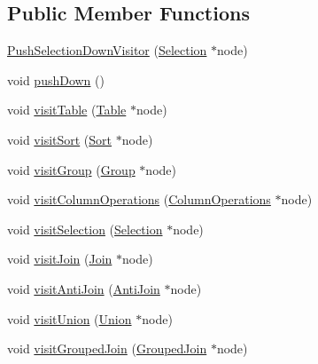 \subsection*{Public Member Functions}
\begin{DoxyCompactItemize}
\item 
\hyperlink{classrafe_1_1_push_selection_down_visitor_a2854b5c8406e3839eb3fe55f3a519418}{Push\+Selection\+Down\+Visitor} (\hyperlink{classrafe_1_1_selection}{Selection} $\ast$node)
\item 
void \hyperlink{classrafe_1_1_push_selection_down_visitor_a5d8909a5f4757aec278c185f41b3e11c}{push\+Down} ()
\item 
void \hyperlink{classrafe_1_1_push_selection_down_visitor_a22d4efbe167182bb5815c3155e4dfb15}{visit\+Table} (\hyperlink{classrafe_1_1_table}{Table} $\ast$node)
\item 
void \hyperlink{classrafe_1_1_push_selection_down_visitor_a4ea8d60b4150cbd0e7f95bd24f551433}{visit\+Sort} (\hyperlink{classrafe_1_1_sort}{Sort} $\ast$node)
\item 
void \hyperlink{classrafe_1_1_push_selection_down_visitor_adc69a8ddf6a81cdfb1ab4ea8b2cdaf6e}{visit\+Group} (\hyperlink{classrafe_1_1_group}{Group} $\ast$node)
\item 
void \hyperlink{classrafe_1_1_push_selection_down_visitor_a4e6aa36753bc28600ea0bebfb4e501fb}{visit\+Column\+Operations} (\hyperlink{classrafe_1_1_column_operations}{Column\+Operations} $\ast$node)
\item 
void \hyperlink{classrafe_1_1_push_selection_down_visitor_a437c6c29c1d52149650c7b1443915d58}{visit\+Selection} (\hyperlink{classrafe_1_1_selection}{Selection} $\ast$node)
\item 
void \hyperlink{classrafe_1_1_push_selection_down_visitor_a97825d74e8407111b3c28b4cd5b139dc}{visit\+Join} (\hyperlink{classrafe_1_1_join}{Join} $\ast$node)
\item 
void \hyperlink{classrafe_1_1_push_selection_down_visitor_ab291a0f8f4e2c3638562b2ab628f9ed9}{visit\+Anti\+Join} (\hyperlink{classrafe_1_1_anti_join}{Anti\+Join} $\ast$node)
\item 
void \hyperlink{classrafe_1_1_push_selection_down_visitor_aa46479b019c02a80571e1b676d1f0aea}{visit\+Union} (\hyperlink{classrafe_1_1_union}{Union} $\ast$node)
\item 
void \hyperlink{classrafe_1_1_push_selection_down_visitor_ab3b99f6ca0ffc272be2a328b3bc13e31}{visit\+Grouped\+Join} (\hyperlink{classrafe_1_1_grouped_join}{Grouped\+Join} $\ast$node)
\end{DoxyCompactItemize}

